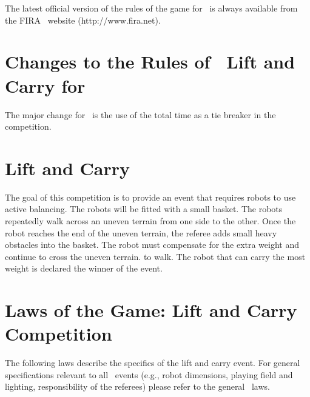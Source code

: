 \documentclass[12pt]{hurocup}
\begin{document}
The latest official version of the rules of the game for \HuroCup\ is
always available from the FIRA \HuroCup\ website (http://www.fira.net).

\section*{Changes to the Rules of \HuroCup\ Lift and Carry for \thisyear}

The major change for \thisyear\ is the use of the total time as a tie
breaker in the competition.

\newpage

\section{Lift and Carry}
\label{sec:lift-and-carry} 

The goal of this competition is to provide an event that requires
robots to use active balancing. The robots will be fitted with a small
basket. The robots repeatedly walk across an uneven terrain from one
side to the other. Once the robot reaches the end of the uneven
terrain, the referee adds small heavy obstacles into the basket. The
robot must compensate for the extra weight and continue to cross the
uneven terrain.  to walk. The robot that can carry the most weight is
declared the winner of the event.

\section{Laws of the Game: Lift and Carry Competition}
\label{sec:rules-lift-carry}

The following laws describe the specifics of the lift and carry
event. For general specifications relevant to all \HuroCup\ events
(e.g., robot dimensions, playing field and lighting, responsibility of
the referees) please refer to the general \HuroCup\ laws.

\label{lc-field}
\end{document}
